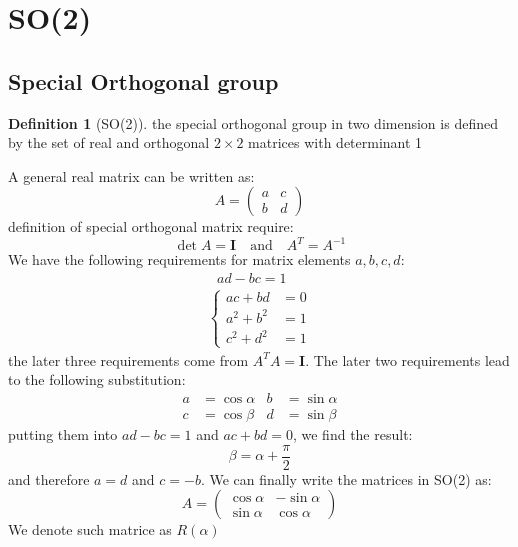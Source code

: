 \documentclass{amsart}
\theoremstyle{remark}
\theoremstyle{remark}
\theoremstyle{definition}
\newtheorem*{definition}{Definition}
\begin{document}
\section{SO(2)}

\subsection{Special Orthogonal group}
\begin{definition}
    [SO(2)] the special orthogonal group in two dimension is defined by the 
    set of real and orthogonal $2\times 2$ matrices with determinant 1
\end{definition}
A general real matrix can be written as:
\begin{equation*}
    A = \left(\begin{matrix}
        a & c \\ b & d
    \end{matrix}\right)
\end{equation*}
definition of special orthogonal matrix require:
\begin{equation*}
    \det A = \mathbf{I}\quad \text{and} \quad A^T = A^{-1}
\end{equation*}
We have the following requirements for matrix elements $a,b,c,d$:
\begin{gather*}
    \ \ \ ad - bc = 1\\
    \begin{cases}
        ac + bd &= 0\\
        a^2 + b^2 &= 1\\
        c^2 + d^2 &= 1
    \end{cases}
\end{gather*}
the later three requirements come from $A^{T}A = \mathbf{I}$. 
The later two requirements lead to the following substitution:
\begin{align*}
    a &= \cos\alpha &  b &= \sin\alpha \\
    c &= \cos\beta &  d &= \sin\beta 
\end{align*}
putting them into $ad - bc = 1$ and $ac + bd = 0$, we find the result:
\begin{equation*}
    \beta = \alpha + \frac{\pi}{2}
\end{equation*}
and therefore $a = d$ and $c = -b$. We can finally write the matrices in SO(2) as:
\begin{equation*}
    A = \left(\begin{matrix}
        \cos\alpha & -\sin\alpha \\ \sin\alpha & \cos\alpha
    \end{matrix}\right)
\end{equation*}
We denote such matrice as $R(\alpha)$
\end{document}
